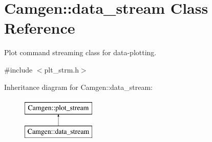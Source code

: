 \hypertarget{a00115}{}\section{Camgen\+:\+:data\+\_\+stream Class Reference}
\label{a00115}


Plot command streaming class for data-\/plotting.  




{\ttfamily \#include $<$plt\+\_\+strm.\+h$>$}

Inheritance diagram for Camgen\+:\+:data\+\_\+stream\+:\begin{figure}[H]
\begin{center}
\leavevmode
\includegraphics[height=2.000000cm]{a00115}
\end{center}
\end{figure}
